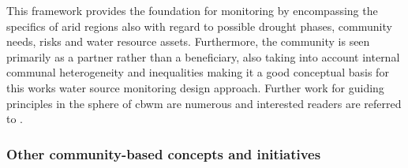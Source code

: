 
This framework provides the foundation for monitoring by encompassing the specifics of arid regions also with regard to possible drought phases, community needs, risks and water resource assets. Furthermore, the community is seen primarily as a partner rather than a beneficiary, also taking into account internal communal heterogeneity and inequalities making it a good conceptual basis for this works water source monitoring design approach.
Further work for guiding principles in the sphere of \acrshort*{cbwm} are numerous and interested readers are referred to \autocite{westonCommunityBasedWaterMonitoring2015}.

\subsubsection*{Other community-based concepts and initiatives} %

